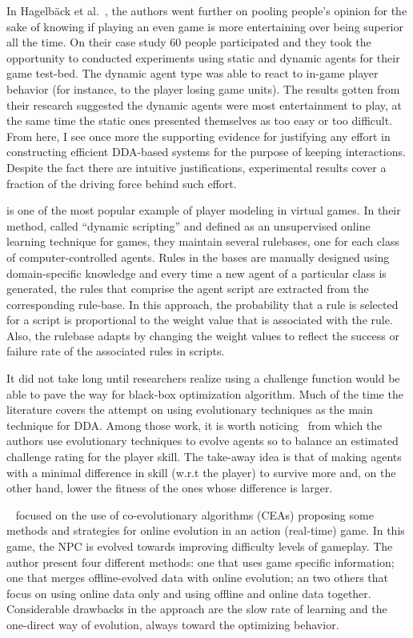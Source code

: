 In Hagelbäck et al.~\cite{hagelback2009measuring}, the authors went further on pooling people's opinion for the sake of knowing if playing an even game is more entertaining over being superior all the time. On their case study 60 people participated and they took the opportunity to conducted experiments using static and dynamic agents for their game test-bed. The dynamic agent type was able to react to in-game player behavior (for instance, to the player losing game units). The results gotten from their research suggested the dynamic agents were most entertainment to play, at the same time the static ones presented themselves as too easy or too difficult. From here, I see once more the supporting evidence for justifying any effort in constructing efficient DDA-based systems for the purpose of keeping interactions. Despite the fact there are intuitive justifications, experimental results cover a fraction of the driving force behind such effort.

\cite{spronck2004line} is one of the most popular example of player modeling in virtual games. In their method, called ``dynamic scripting'' and defined as an unsupervised online learning technique for games, they maintain several rulebases, one for each class of computer-controlled agents. Rules in the bases are manually designed using domain-specific knowledge and every time a new agent of a particular class is generated, the rules that comprise the agent script are extracted from the corresponding rule-base. In this approach, the probability that a rule is selected for a script is proportional to the weight value that is associated with the rule. Also, the rulebase adapts by changing the weight values to reflect the success or failure rate of the associated rules in scripts.

It did not take long until researchers realize using a challenge function would be able to pave the way for black-box optimization algorithm. Much of the time the literature covers the attempt on using evolutionary techniques as the main technique for DDA. Among those work, it is worth noticing~\cite{Yannakakis2008} from which the authors use evolutionary techniques to evolve agents so to balance an estimated challenge rating for the player skill. The take-away idea is that of making agents with a minimal difference in skill (w.r.t the player) to survive more and, on the other hand, lower the fitness of the ones whose difference is larger.

~\cite{DemasiC02} focused on the use of co-evolutionary algorithms (CEAs) proposing some methods and strategies for online evolution in an action (real-time) game. In this game, the NPC is evolved towards improving difficulty levels of gameplay. The author present four different methods: one that uses game specific information; one that merges offline-evolved data with online evolution; an two others that focus on using online data only and using offline and online data together. Considerable drawbacks in the approach are the slow rate of learning and the one-direct way of evolution, always toward the optimizing behavior.

